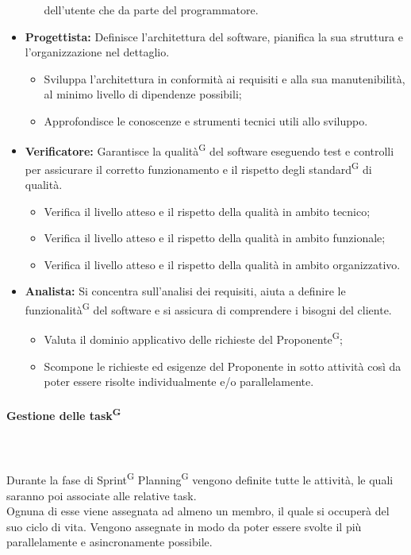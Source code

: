 \documentclass[8pt]{article}
\newcommand{\glossterm}[1]{#1\textsuperscript{G}} %
\newcommand{\subsubsubsection}[1]{\paragraph{#1}\mbox{}\\}
\begin{document}
\begin{itemize}
\begin{itemize}
        dell'utente che da parte del programmatore.
  \end{itemize}
  \item \textbf{Progettista:} Definisce l'architettura del software, pianifica la sua struttura e l'organizzazione nel dettaglio.
	\begin{itemize}
    \item Sviluppa l'architettura in conformità ai requisiti e alla sua manutenibilità, al minimo
        livello di dipendenze possibili;
    \item Approfondisce le conoscenze e strumenti tecnici utili allo sviluppo.
  \end{itemize}
  \item \textbf{Verificatore:} Garantisce la \glossterm{qualità} del software eseguendo test e controlli per assicurare il corretto funzionamento e il rispetto degli \glossterm{standard} di qualità.
	\begin{itemize}
    \item Verifica il livello atteso e il rispetto della qualità in ambito tecnico;
    \item Verifica il livello atteso e il rispetto della qualità in ambito funzionale;
    \item Verifica il livello atteso e il rispetto della qualità in ambito organizzativo.
  \end{itemize}
  \item \textbf{Analista:} Si concentra sull'analisi dei requisiti, aiuta a definire le \glossterm{funzionalità} del software e si assicura di comprendere i bisogni del cliente.
  \begin{itemize}
    \item Valuta il dominio applicativo delle richieste del \glossterm{Proponente};
    \item Scompone le richieste ed esigenze del Proponente in sotto attività così da poter essere
        risolte individualmente e/o parallelamente.
  \end{itemize}
\end{itemize}
\subsubsubsection{Gestione delle \glossterm{task}} \label{sec:gestione_task}\\
Durante la fase di \glossterm{Sprint} \glossterm{Planning} vengono definite tutte le attività, le quali saranno poi associate alle relative task.\\
Ognuna di esse viene assegnata ad almeno un membro, il quale si occuperà del suo ciclo di vita. Vengono assegnate in modo da poter essere svolte il più parallelamente e asincronamente possibile.\\
\end{document}
